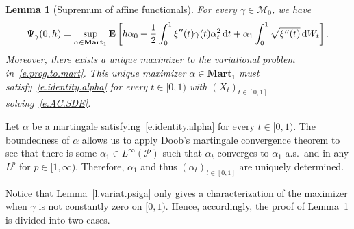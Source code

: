 \documentclass[11pt]{amsart}
\newtheorem{lemma}[proposition]{Lemma}
\theoremstyle{remark}
\theoremstyle{definition}
\numberwithin{equation}{section}
\numberwithin{proposition}{section}
\numberwithin{figure}{section}
\numberwithin{table}{section}
\newcommand{\EE}{\mathbf{E}}
\newcommand{\Ll}{\left}
\newcommand{\Rr}{\right}
\renewcommand{\d}{\mathrm{d}}
\newcommand{\1}{\mathbf{1}}
\newcommand{\mcl}{\mathcal}
\newcommand{\msc}{\mathscr}
\newcommand{\al}{\alpha}
\newcommand{\ga}{\gamma}
\newcommand{\bmart}{\mathbf{Mart}}
\begin{document}
\begin{lemma}[Supremum of affine functionals]
\label{l.prog.to.mart}
For every $\ga \in \mcl M_0$, we have
\begin{equation}  
\label{e.prog.to.mart}
\Psi_\ga(0,h) 
\\
= \sup_{\al \in \bmart_1} \EE \Ll[ h \al_0 + \frac{1}{2}\int_{0}^{1}\xi''(t)\ga(t) \alpha^{2}_t\, \d t + \al_1 \int_0^1 \sqrt{\xi''(t)}\, \d W_t \Rr] .
\end{equation}
Moreover, there exists a unique maximizer to the variational problem in~\eqref{e.prog.to.mart}. This unique maximizer $\al \in \bmart_1$ must satisfy~\eqref{e.identity.alpha} for every $t \in [0,1)$ with $(X_t)_{t \in [0,1]}$ solving~\eqref{e.AC.SDE}. 
\end{lemma}

Let $\alpha$ be a martingale satisfying~\eqref{e.identity.alpha} for every $t\in[0,1)$.
The boundedness of $\alpha$ allows us to apply Doob's martingale convergence theorem to see that there is some $\alpha_1 \in L^\infty(\msc P)$ such that $\alpha_t$ converges to $\alpha_1$ a.s.\ and in any $L^p$ for $p\in[1,\infty)$. Therefore, $\alpha_1$ and thus $(\alpha_t)_{t\in[0,1]}$ are uniquely determined.


Notice that Lemma~\ref{l.variat.psiga} only gives a characterization of the maximizer when $\gamma$ is not constantly zero on $[0,1)$. Hence, accordingly, the proof of Lemma~\ref{l.prog.to.mart} is divided into two cases.
\end{document}
